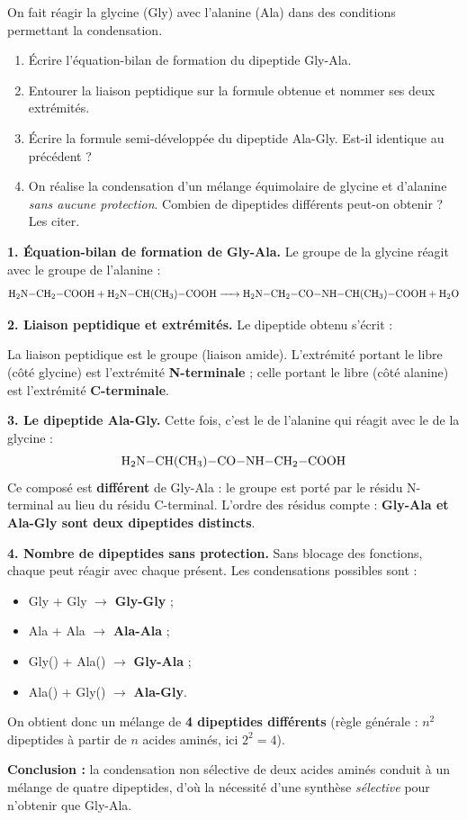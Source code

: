 \documentclass[11pt]{article}
\begin{document}
\begin{exoresolu}
On fait réagir la glycine  (Gly) avec l'alanine  (Ala) dans des conditions permettant la condensation.
\begin{enumerate}
\item Écrire l'équation-bilan de formation du dipeptide Gly-Ala.
\item Entourer la liaison peptidique sur la formule obtenue et nommer ses deux extrémités.
\item Écrire la formule semi-développée du dipeptide Ala-Gly. Est-il identique au précédent ?
\item On réalise la condensation d'un mélange équimolaire de glycine et d'alanine \emph{sans aucune protection}. Combien de dipeptides différents peut-on obtenir ? Les citer.
\end{enumerate}
\tcblower
\textbf{1. Équation-bilan de formation de Gly-Ala.} Le groupe  de la glycine réagit avec le groupe  de l'alanine :
\[ \ce{H2N-CH2-COOH + H2N-CH(CH3)-COOH -> H2N-CH2-CO-NH-CH(CH3)-COOH + H2O} \]

\textbf{2. Liaison peptidique et extrémités.} Le dipeptide obtenu s'écrit :
\begin{center}
\end{center}
La liaison peptidique est le groupe \textbf{} (liaison amide). L'extrémité portant le  libre (côté glycine) est l'extrémité \textbf{N-terminale} ; celle portant le  libre (côté alanine) est l'extrémité \textbf{C-terminale}.

\textbf{3. Le dipeptide Ala-Gly.} Cette fois, c'est le  de l'alanine qui réagit avec le  de la glycine :
\[ \ce{H2N-CH(CH3)-CO-NH-CH2-COOH} \]
Ce composé est \textbf{différent} de Gly-Ala : le groupe  est porté par le résidu N-terminal au lieu du résidu C-terminal. L'ordre des résidus compte : \textbf{Gly-Ala et Ala-Gly sont deux dipeptides distincts}.

\textbf{4. Nombre de dipeptides sans protection.} Sans blocage des fonctions, chaque  peut réagir avec chaque  présent. Les condensations possibles sont :
\begin{itemize}
\item Gly + Gly $\rightarrow$ \textbf{Gly-Gly} ;
\item Ala + Ala $\rightarrow$ \textbf{Ala-Ala} ;
\item Gly() + Ala() $\rightarrow$ \textbf{Gly-Ala} ;
\item Ala() + Gly() $\rightarrow$ \textbf{Ala-Gly}.
\end{itemize}
On obtient donc un mélange de \textbf{4 dipeptides différents} (règle générale : $n^2$ dipeptides à partir de $n$ acides aminés, ici $2^2 = 4$).

\textbf{Conclusion :} la condensation non sélective de deux acides aminés conduit à un mélange de quatre dipeptides, d'où la nécessité d'une synthèse \emph{sélective} pour n'obtenir que Gly-Ala.
\end{exoresolu}
\end{document}
